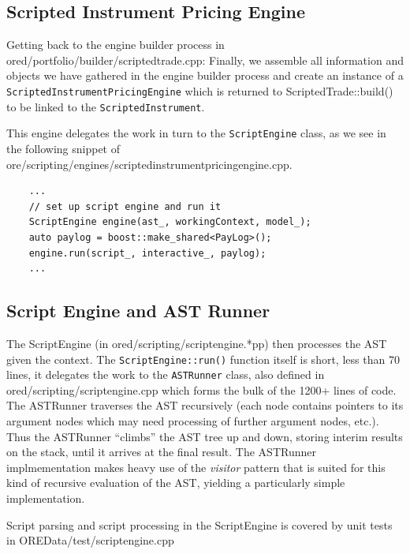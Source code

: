 \documentclass[12pt, a4paper]{report}
\begin{document}
\subsection{Scripted Instrument Pricing Engine}

Getting back to the engine builder process in ored/portfolio/builder/scriptedtrade.cpp:
Finally, we assemble all information and objects we have gathered in the engine builder process and
create an instance of a {\tt ScriptedInstrumentPricingEngine} which is returned to
ScriptedTrade::build() to be linked to the {\tt ScriptedInstrument}.

This engine delegates the work in turn to the {\tt ScriptEngine} class, as we see in the following
snippet of ore/scripting/engines/scriptedinstrumentpricingengine.cpp.

\begin{verbatim}
    ...
    // set up script engine and run it
    ScriptEngine engine(ast_, workingContext, model_);
    auto paylog = boost::make_shared<PayLog>();
    engine.run(script_, interactive_, paylog);
    ...
\end{verbatim}

\subsection{Script Engine and AST Runner}

The ScriptEngine (in ored/scripting/scriptengine.*pp) then processes the AST given the context.
The {\tt ScriptEngine::run()} function itself is short, less than 70 lines, it delegates the work
to the {\tt ASTRunner} class, also defined in ored/scripting/scriptengine.cpp which forms the bulk
of the 1200+ lines of code. The ASTRunner traverses the AST recursively (each node contains pointers
to its argument nodes which may need processing of further argument nodes, etc.). Thus the ASTRunner
``climbs'' the AST tree up and down, storing interim results on the stack, until it arrives at the
final result. The ASTRunner implmementation makes heavy use of the {\em visitor} pattern that
is suited for this kind of recursive evaluation of the AST, yielding a particularly simple
implementation. 

Script parsing and script processing in the ScriptEngine is covered by unit tests in
OREData/test/scriptengine.cpp


\end{document}
